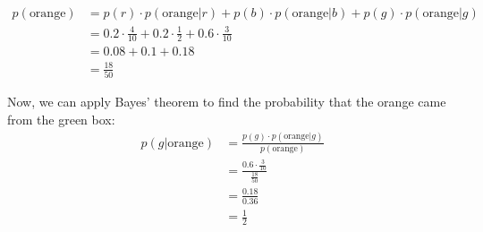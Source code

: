 \documentclass{article}
\begin{document}
\begin{tcolorbox}[breakable,colback=gray!5,colframe=gray!60,title=Solution]
\begin{align*}
  p(\text{orange}) &= p(r) \cdot p(\text{orange} | r) + p(b) \cdot p(\text{orange} | b) + p(g) \cdot p(\text{orange} | g) \\
  &= 0.2 \cdot \frac{4}{10} + 0.2 \cdot \frac{1}{2} + 0.6 \cdot \frac{3}{10} \\
  &= 0.08 + 0.1 + 0.18 \\
  &= \frac{18}{50}
\end{align*}

Now, we can apply Bayes' theorem to find the probability that the orange came from the green box:
\begin{align*}
  p(g | \text{orange}) &= \frac{p(g) \cdot p(\text{orange} | g)}{p(\text{orange})} \\
  &= \frac{0.6 \cdot \frac{3}{10}}{\frac{18}{50}} \\
  &= \frac{0.18}{0.36} \\
  &= \frac{1}{2}
\end{align*}
\end{tcolorbox}
\end{document}
